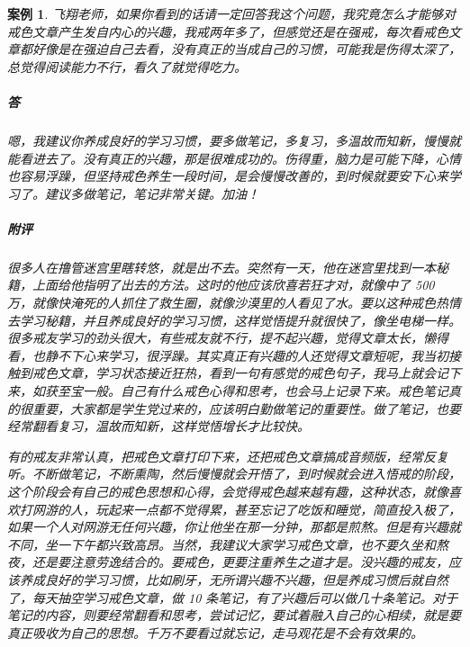 \documentclass{ctexart}
\newtheorem{case}{案例}
\begin{document}
\begin{case}
    飞翔老师，如果你看到的话请一定回答我这个问题，我究竟怎么才能够对戒色文章产生发自内心的兴趣，我戒两年多了，但感觉还是在强戒，每次看戒色文章都好像是在强迫自己去看，没有真正的当成自己的习惯，可能我是伤得太深了，总觉得阅读能力不行，看久了就觉得吃力。
    \subparagraph{答} 嗯，我建议你养成良好的学习习惯，要多做笔记，多复习，多温故而知新，慢慢就能看进去了。没有真正的兴趣，那是很难成功的。伤得重，脑力是可能下降，心情也容易浮躁，但坚持戒色养生一段时间，是会慢慢改善的，到时候就要安下心来学习了。建议多做笔记，笔记非常关键。加油！
    \subparagraph{附评} 很多人在撸管迷宫里瞎转悠，就是出不去。突然有一天，他在迷宫里找到一本秘籍，上面给他指明了出去的方法。这时的他应该欣喜若狂才对，就像中了 500 万，就像快淹死的人抓住了救生圈，就像沙漠里的人看见了水。要以这种戒色热情去学习秘籍，并且养成良好的学习习惯，这样觉悟提升就很快了，像坐电梯一样。很多戒友学习的劲头很大，有些戒友就不行，提不起兴趣，觉得文章太长，懒得看，也静不下心来学习，很浮躁。其实真正有兴趣的人还觉得文章短呢，我当初接触到戒色文章，学习状态接近狂热，看到一句有感觉的戒色句子，我马上就会记下来，如获至宝一般。自己有什么戒色心得和思考，也会马上记录下来。戒色笔记真的很重要，大家都是学生党过来的，应该明白勤做笔记的重要性。做了笔记，也要经常翻看复习，温故而知新，这样觉悟增长才比较快。

    有的戒友非常认真，把戒色文章打印下来，还把戒色文章搞成音频版，经常反复听。不断做笔记，不断熏陶，然后慢慢就会开悟了，到时候就会进入悟戒的阶段，这个阶段会有自己的戒色思想和心得，会觉得戒色越来越有趣，这种状态，就像喜欢打网游的人，玩起来一点都不觉得累，甚至忘记了吃饭和睡觉，简直投入极了，如果一个人对网游无任何兴趣，你让他坐在那一分钟，那都是煎熬。但是有兴趣就不同，坐一下午都兴致高昂。当然，我建议大家学习戒色文章，也不要久坐和熬夜，还是要注意劳逸结合的。要戒色，更要注重养生之道才是。没兴趣的戒友，应该养成良好的学习习惯，比如刷牙，无所谓兴趣不兴趣，但是养成习惯后就自然了，每天抽空学习戒色文章，做 10 条笔记，有了兴趣后可以做几十条笔记。对于笔记的内容，则要经常翻看和思考，尝试记忆，要试着融入自己的心相续，就是要真正吸收为自己的思想。千万不要看过就忘记，走马观花是不会有效果的。
\end{case}
\end{document}
